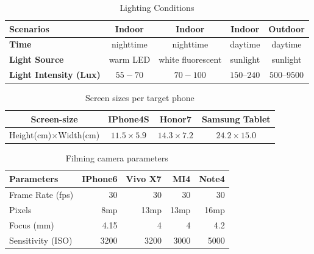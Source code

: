        \begin{table}[!t]
            \centering
            \caption{Lighting Conditions}
            \vspace{-2mm}
            \label{tab:light}
            \scriptsize
            \begin{tabular}{lcccc}
                \toprule
                \textbf{Scenarios} & Indoor  & Indoor & Indoor  & Outdoor\\
                \midrule
                \textbf{Time} & nighttime &  nighttime & daytime & daytime \\
                \textbf{Light Source}& warm LED & white fluorescent & sunlight &  sunlight \\
                \textbf{Light Intensity (Lux)} & $55-70$ & $70-100$ & $150$--$240$ & $500$--$9500$ \\
                \bottomrule
            \end{tabular}
            \vspace{-3mm}
        \end{table}


    \begin{table}[!t]
            \centering
            \caption{Screen sizes per target phone}
            \vspace{-2mm}
            \label{tab:screen-size}
            \scriptsize
            \begin{tabular}{cccc}
                \toprule
                \textbf{Screen-size}& \textbf{IPhone4S }& \textbf{Honor7} & \textbf{Samsung Tablet} \\
                \midrule
                Height(cm)$\times$Width(cm) & $11.5\times5.9$ & $14.3\times7.2$ & $24.2\times15.0$ \\
                \bottomrule
            \end{tabular}
            \vspace{-4mm}
    \end{table}

    \begin{table}[!t]
            \centering
            \caption{Filming camera parameters}
            \vspace{-2mm}
            \label{tab:camera-parameters}
            \scriptsize
            \begin{tabular}{lrrrr}
                \toprule
                \textbf{Parameters}& \textbf{IPhone6} & \textbf{Vivo X7} & \textbf{MI4} & \textbf{Note4} \\
                \midrule
                Frame Rate (fps) & $30$ & $30$& $30$ & 30 \\
                Pixels & 8mp & 13mp & 13mp & 16mp \\
                Focus (mm) & 4.15 & 4 & 4 & 4.2 \\
                Sensitivity (ISO) & 3200 & 3200 & 3000 & 5000 \\
                \bottomrule
            \end{tabular}
            \vspace{-4mm}
    \end{table}

